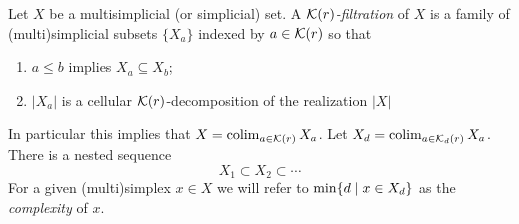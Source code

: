 \begin{definition}
	Let $X$ be a multisimplicial (or simplicial) set.
	A \textit{$\mathcal{K}(r)$-filtration} of $X$ is a family of (multi)simplicial subsets $\{X_a\}$ indexed by
	$a \in \mathcal{K}(r)$ so that
	\begin{enumerate}
		\item $a \leq b$ implies $X_a \subseteq X_b$;
		\item $|X_a|$ is a cellular $\mathcal{K}(r)$-decomposition of the realization $|X|$
	\end{enumerate}
	In particular this implies that $X=\operatorname*{colim}_{a \in \mathcal{K}(r)}X_a$.
	Let $X_d = \operatorname*{colim}_{a \in \mathcal{K}_d(r)} X_a$.
	There is a nested sequence
	\[
	X_1 \subset X_2 \subset \dotsb
	\]
	For a given (multi)simplex $x \in X$ we will refer to $\min\{d \mid x \in X_d\}$ as the \textit{complexity} of $x$.
\end{definition}